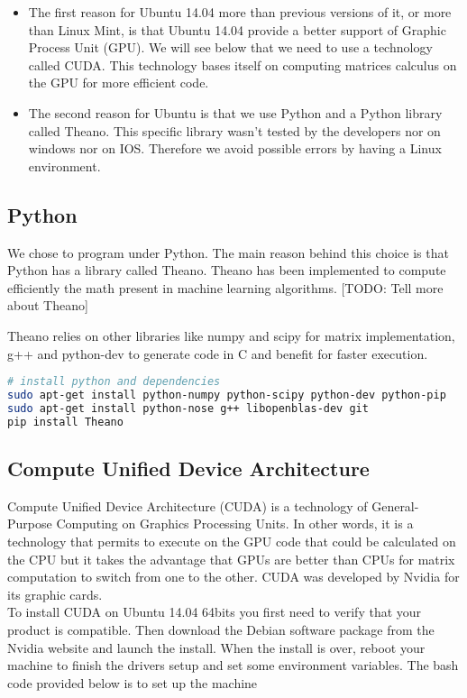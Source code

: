 		\begin{itemize}
			
			\item The first reason for Ubuntu 14.04 more than previous versions of it, or more than Linux Mint, is that Ubuntu 14.04 provide a better support of Graphic Process Unit (GPU). We will see below that we need to use a technology called CUDA. This technology bases itself on computing matrices calculus on the GPU for more efficient code.

			\item The second reason for Ubuntu is that we use Python and a Python library called Theano. This specific library wasn't tested by the developers nor on windows nor on IOS. Therefore we avoid possible errors by having a Linux environment.



		\end{itemize}


	\subsection{Python}
		We chose to program under Python. The main reason behind this choice is that Python has a library called Theano.
		Theano has been implemented to compute efficiently the math present in machine learning algorithms. 
		[TODO: Tell more about Theano]

		Theano relies on other libraries like numpy and scipy for matrix implementation, g++ and python-dev to generate code in C and benefit for faster execution. 

		\begin{lstlisting}[language=bash]
# install python and dependencies
sudo apt-get install python-numpy python-scipy python-dev python-pip 
sudo apt-get install python-nose g++ libopenblas-dev git
pip install Theano
		\end{lstlisting}



	\subsection{Compute Unified Device Architecture}
		Compute Unified Device Architecture (CUDA) is a technology of General-Purpose Computing on Graphics Processing Units. In other words, it is a technology that permits to execute on the GPU code that could be calculated on the CPU but it takes the advantage that GPUs are better than CPUs for matrix computation to switch from one to the other.
		CUDA was developed by Nvidia for its graphic cards.
		\\
		To install CUDA on Ubuntu 14.04 64bits you first need to verify that your product is compatible\cite{website:CUDA_compatibility}. Then download the Debian software package from the Nvidia website and launch the install.
		When the install is over, reboot your machine to finish the drivers setup and set some environment variables.
		The bash code provided below is to set up the machine
 

